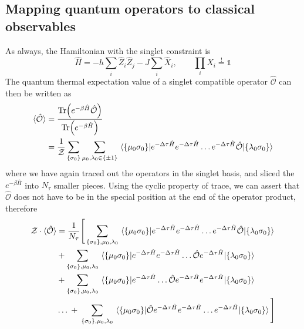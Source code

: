 \documentclass[../thesis_main.tex]{subfiles}
\begin{document}
\subsection{Mapping quantum operators to classical observables}
As always, the Hamiltonian with the singlet constraint is
\begin{equation}
    \hat{H} = - h \sum_i \hat{Z}_i \hat{Z}_j - J \sum_i \hat{X}_i, \qquad \prod_i X_i \stackrel{!}{=} \mathds{1}
\end{equation}
The quantum thermal expectation value of a singlet compatible operator $\hat{\mathcal{O}}$ can then be written as
\begin{align}
    \langle {\hat{\mathcal{O}}} \rangle  &= \frac{\Tr(e^{-\beta \hat{H}}\hat{\mathcal{O}})}{\Tr(e^{-\beta \hat{H}})} \nonumber \\
    &= \frac{1}{\mathcal{Z}} \sum_{\{\sigma_0 \}} \sum_{\mu_0, \lambda_0 \in \{\pm 1\}} \mel{\{\mu_0 \sigma _0\}}{e^{-\Delta \tau \hat{H}} e^{-\Delta \tau \hat{H}} \ldots e^{-\Delta \tau \hat{H}} \hat{\mathcal{O}}}{\{\lambda_0 \sigma _0\}}    
\end{align}
where we have again traced out the operators in the singlet basis, and sliced the $e^{-\beta \hat{H}}$ into $N_\tau$ smaller pieces. Using the cyclic property of trace, we can assert that $\hat{\mathcal{O}}$ does not have to be in the special position at the end of the operator product, therefore
\begin{align}
    \mathcal{Z} \cdot \langle {\hat{\mathcal{O}}} \rangle & = \frac{1}{N_\tau} \Bigg[ \sum_{\{\sigma_0 \}, \mu_0, \lambda_0} \mel{\{\mu_0 \sigma _0\}}{e^{-\Delta \tau \hat{H}} e^{-\Delta \tau \hat{H}} \ldots e^{-\Delta \tau \hat{H}} \hat{\mathcal{O}}}{\{\lambda_0 \sigma _0\}} \nonumber \\
    & + \sum_{\{\sigma_0 \}, \mu_0, \lambda_0} \mel{\{\mu_0 \sigma _0\}}{e^{-\Delta \tau \hat{H}} e^{-\Delta \tau \hat{H}} \ldots \hat{\mathcal{O}} e^{-\Delta \tau \hat{H}} }{\{\lambda_0 \sigma _0\}} \nonumber \\
    & + \sum_{\{\sigma_0 \}, \mu_0, \lambda_0} \mel{\{\mu_0 \sigma _0\}}{e^{-\Delta \tau \hat{H}} \ldots \hat{\mathcal{O}} e^{-\Delta \tau \hat{H}} e^{-\Delta \tau \hat{H}} }{\{\lambda_0 \sigma _0\}} \nonumber\\
    & \ldots  \: + \: \sum_{\{\sigma_0 \}, \mu_0, \lambda_0} \mel{\{\mu_0 \sigma _0\}}{\hat{\mathcal{O}} e^{-\Delta \tau \hat{H}} e^{-\Delta \tau \hat{H}} \ldots e^{-\Delta \tau \hat{H}}}{\{\lambda_0 \sigma _0\}} \Bigg]
\end{align}
\end{document}
